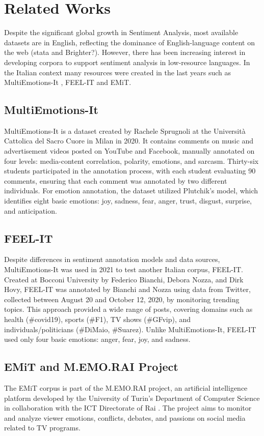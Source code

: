 \documentclass[letterpaper,journal]{IEEEtran}
\begin{document}
\section{Related Works}

Despite the significant global growth in Sentiment Analysis, most available datasets are in English, reflecting the dominance of English-language content on the web (stata and Brighter?). However, there has been increasing interest in developing corpora to support sentiment analysis in low-resource languages. In the Italian context many resources were created in the last years such as MultiEmotions-It \cite{MultiEmotion}, FEEL-IT \cite{bianchi2021feel} and EMiT\cite{emit}.

\subsection{MultiEmotions-It}
MultiEmotions-It is a dataset created by Rachele Sprugnoli at the Università Cattolica del Sacro Cuore in Milan in 2020. It contains comments on music and advertisement videos posted on YouTube and Facebook, manually annotated on four levels: media-content correlation, polarity, emotions, and sarcasm. Thirty-six students participated in the annotation process, with each student evaluating 90 comments, ensuring that each comment was annotated by two different individuals. For emotion annotation, the dataset utilized Plutchik’s model, which identifies eight basic emotions: joy, sadness, fear, anger, trust, disgust, surprise, and anticipation.

\subsection{FEEL-IT}
Despite differences in sentiment annotation models and data sources, MultiEmotions-It was used in 2021 to test another Italian corpus, FEEL-IT. Created at Bocconi University by Federico Bianchi, Debora Nozza, and Dirk Hovy, FEEL-IT was annotated by Bianchi and Nozza using data from Twitter, collected between August 20 and October 12, 2020, by monitoring trending topics. This approach provided a wide range of posts, covering domains such as health (\#covid19), sports (\#F1), TV shows (\#GFvip), and individuals/politicians (\#DiMaio, \#Suarez). Unlike MultiEmotions-It, FEEL-IT used only four basic emotions: anger, fear, joy, and sadness.

\subsection{EMiT and M.EMO.RAI Project}
The EMiT corpus is part of the M.EMO.RAI project, an artificial intelligence platform developed by the University of Turin's Department of Computer Science in collaboration with the ICT Directorate of Rai \cite{memorai}. The project aims to monitor and analyze viewer emotions, conflicts, debates, and passions on social media related to TV programs.
\end{document}
